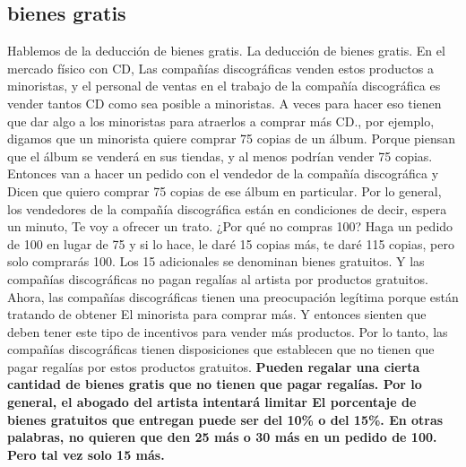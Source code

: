 \documentclass[10pt]{book}
\begin{document}
\subsection{bienes gratis}
Hablemos de la deducción de bienes gratis. La deducción de bienes gratis. En el mercado físico con CD, Las compañías discográficas venden estos productos a minoristas, y el personal de ventas en el trabajo de la compañía discográfica es vender tantos CD como sea posible a minoristas. A veces para hacer eso tienen que dar algo a los minoristas para atraerlos a comprar más CD., por ejemplo, digamos que un minorista quiere comprar 75 copias de un álbum. Porque piensan que el álbum se venderá en sus tiendas, y al menos podrían vender 75 copias. Entonces van a hacer un pedido con el vendedor de la compañía discográfica y Dicen que quiero comprar 75 copias de ese álbum en particular. Por lo general, los vendedores de la compañía discográfica están en condiciones de decir, espera un minuto, Te voy a ofrecer un trato. ¿Por qué no compras 100? Haga un pedido de 100 en lugar de 75 y si lo hace, le daré 15 copias más, te daré 115 copias, pero solo comprarás 100. Los 15 adicionales se denominan bienes gratuitos. Y las compañías discográficas no pagan regalías al artista por productos gratuitos. Ahora, las compañías discográficas tienen una preocupación legítima porque están tratando de obtener El minorista para comprar más. Y entonces sienten que deben tener este tipo de incentivos para vender más productos. Por lo tanto, las compañías discográficas tienen disposiciones que establecen que no tienen que pagar regalías por estos productos gratuitos. \textbf{Pueden regalar una cierta cantidad de bienes gratis que no tienen que pagar regalías. Por lo general, el abogado del artista intentará limitar El porcentaje de bienes gratuitos que entregan puede ser del 10\% o del 15\%. En otras palabras, no quieren que den 25 más o 30 más en un pedido de 100. Pero tal vez solo 15 más.}
\end{document}
